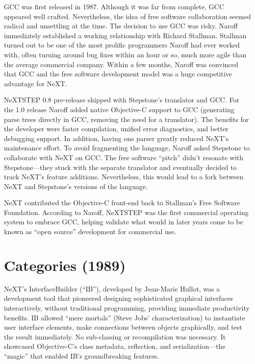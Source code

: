\documentclass[acmsmall,screen]{acmart}
\begin{document}
GCC was first released in 1987. Although it was far from complete, GCC appeared well crafted. Nevertheless, the idea of free software collaboration seemed radical and unsettling at the time. The decision to use GCC was risky. Naroff immediately established a working relationship with Richard Stallman. Stallman turned out to be one of the most prolific programmers Naroff had ever worked with, often turning around bug fixes within an hour or so, much more agile than the average commercial company. Within a few months, Naroff was convinced that GCC and the free software development model was a huge competitive advantage for NeXT.

NeXTSTEP 0.8 pre-release shipped with Stepstone's translator and GCC. For the 1.0 release Naroff added native Objective-C support to GCC (generating parse trees directly in GCC, removing the need for a translator). The benefits for the developer were faster compilation, unified error diagnostics, and better debugging support. In addition, having one parser greatly reduced NeXT's maintenance effort. To avoid fragmenting the language, Naroff asked Stepstone to collaborate with NeXT on GCC. The free software ``pitch'' didn't resonate with Stepstone---they stuck with the separate translator and eventually decided to track NeXT's feature additions. Nevertheless, this would lead to a fork between NeXT and Stepstone's versions of the language.

NeXT contributed the Objective-C front-end back to Stallman's Free Software Foundation. According to Naroff, NeXTSTEP was the first commercial operating system to embrace GCC, helping validate what would in later years come to be known as ``open source'' development for commercial use.

\section{Categories (1989)}
\label{sec-categories1989}
NeXT's InterfaceBuilder (``IB''), developed by Jean-Marie Hullot, was a development tool that pioneered designing sophisticated graphical interfaces interactively, without traditional programming, providing immediate productivity benefits. IB allowed ``mere mortals'' (Steve Jobs' characterization) to instantiate user interface elements, make connections between objects graphically, and test the result immediately. No sub-classing or recompilation was necessary. It showcased Objective-C's class metadata, reflection, and serialization---the ``magic'' that enabled IB's groundbreaking features.
\end{document}
